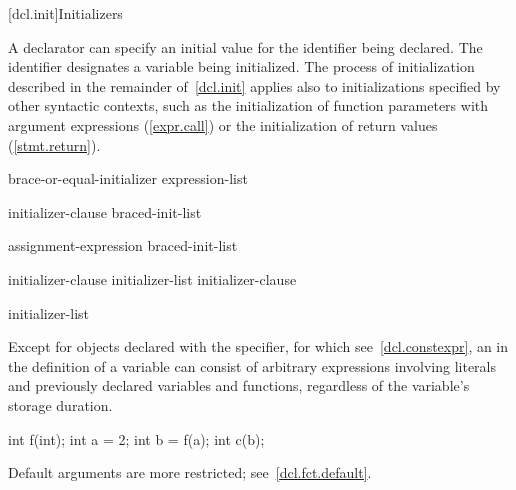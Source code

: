 [dcl.init]{Initializers}%

\pnum
A declarator can specify an initial value for the
identifier being declared.
The identifier designates a variable being initialized.
The process of initialization described in the
remainder of~\ref{dcl.init}
applies also to initializations
specified by other syntactic contexts, such as the initialization
of function parameters with argument expressions (\ref{expr.call}) or
the initialization of return values (\ref{stmt.return}).

\begin{bnf}
\br
    brace-or-equal-initializer\br
    \terminal{(} expression-list \terminal{)}
\end{bnf}

\begin{bnf}
\br
    \terminal{=} initializer-clause\br
    braced-init-list
\end{bnf}

\begin{bnf}
\br
    assignment-expression\br
    braced-init-list
\end{bnf}

\begin{bnf}
\br
    initializer-clause \opt\br
    initializer-list \terminal{,} initializer-clause \opt
\end{bnf}

\begin{bnf}
\br
    \terminal{\{} initializer-list \terminal{,\opt} \terminal{\}}\br
    \terminal{\{} \terminal{\}}
\end{bnf}

\pnum
Except for objects declared with the  specifier, for which see~\ref{dcl.constexpr},
an  in the definition of a variable can consist of
arbitrary
%
%
expressions involving literals and previously declared
variables and functions,
regardless of the variable's storage duration.
\enterexample

\begin{codeblock}
int f(int);
int a = 2;
int b = f(a);
int c(b);
\end{codeblock}
\exitexample

\pnum
\enternote
Default arguments are more restricted; see~\ref{dcl.fct.default}.

